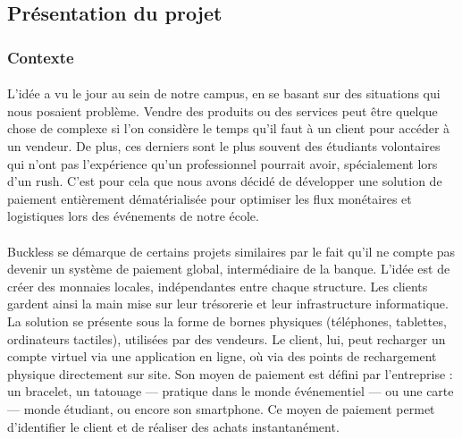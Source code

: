 \subsection{Présentation du projet}
    \subsubsection{Contexte}
        \paragraph{}
            L’idée a vu le jour au sein de notre campus, en se basant sur des situations qui nous posaient problème.
            Vendre des produits ou des services peut être quelque chose de complexe si l’on considère le temps
            qu’il faut à un client pour accéder à un vendeur. De plus, ces derniers sont le plus souvent des étudiants
            volontaires qui n’ont pas l’expérience qu’un professionnel pourrait avoir, spécialement lors d’un rush.
            C’est pour cela que nous avons décidé de développer une solution de paiement entièrement dématérialisée
            pour optimiser les flux monétaires et logistiques lors des événements de notre école.

        \paragraph{}
            Buckless se démarque de certains projets similaires par le fait qu’il ne compte pas devenir un système
            de paiement global, intermédiaire de la banque. L’idée est de créer des monnaies locales, indépendantes
            entre chaque structure. Les clients gardent ainsi la main mise sur leur trésorerie et leur infrastructure
            informatique.
            La solution se présente sous la forme de bornes physiques (téléphones, tablettes, ordinateurs tactiles),
            utilisées par des vendeurs. Le client, lui, peut recharger un compte virtuel via une application en ligne,
            où via des points de rechargement physique directement sur site. Son moyen de paiement est défini par l'entreprise :
            un bracelet, un tatouage — pratique dans le monde événementiel — ou une carte — monde étudiant, ou encore
            son smartphone. Ce moyen de paiement permet d'identifier le client et de réaliser des achats instantanément.

